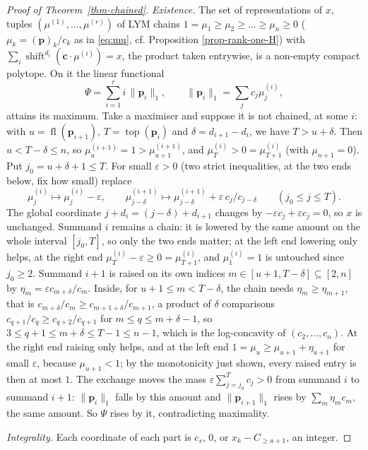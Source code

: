 \documentclass[11pt, a4paper, abstract=yes]{scrartcl}
\theoremstyle{definition}
\theoremstyle{remark}
\theoremstyle{plain}
\newcommand{\vek}[1]{\boldsymbol{#1}}
\theoremstyle{remark}
\theoremstyle{plain}
\newcommand{\shift}{\operatorname{shift}}
\newcommand{\tp}{\operatorname{top}}
\newcommand{\fl}{\operatorname{fl}}
\begin{document}
\begin{proof}[Proof of Theorem~\ref{thm-chained}]
\emph{Existence.} The set of representations of \(x\), tuples \((\mu^{(1)},\dots,\mu^{(r)})\) of LYM
chains \(1=\mu_1\ge\mu_2\ge\dots\ge\mu_n\ge0\) (\(\mu_k=(\vek p)_k/c_k\) as in \eqref{eq:mu}, cf. Proposition
\ref{prop-rank-one-H}) with \(\sum_i\shift^{d_i}(\vek c\cdot\mu^{(i)})=x\), the product taken
entrywise, is a non-empty compact polytope. On it the linear functional
\begin{equation}\label{eq:Psi}
  \Psi=\sum_{i=1}^r i\,\bigl\lVert\vek p_i\bigr\rVert_1,\qquad
  \bigl\lVert\vek p_i\bigr\rVert_1=\sum_{j}c_j\mu^{(i)}_j ,
\end{equation}
attains its maximum. Take a maximiser and suppose it is not chained, at some \(i\): with
\(u=\fl(\vek p_{i+1})\), \(T=\tp(\vek p_i)\) and \(\delta=d_{i+1}-d_i\), we have \(T>u+\delta\).
Then \(u<T-\delta\le n\), so \(\mu^{(i+1)}_u=1>\mu^{(i+1)}_{u+1}\), and \(\mu^{(i)}_T>0=\mu^{(i)}_{T+1}\)
(with \(\mu_{n+1}=0\)). Put \(j_0=u+\delta+1\le T\). For small \(\varepsilon>0\) (two strict
inequalities, at the two ends below, fix how small) replace
\begin{equation}\label{eq:exchange}
  \mu^{(i)}_j\mapsto\mu^{(i)}_j-\varepsilon,\qquad
  \mu^{(i+1)}_{j-\delta}\mapsto\mu^{(i+1)}_{j-\delta}+\varepsilon\,c_j/c_{j-\delta}\qquad(j_0\le j\le T).
\end{equation}
The global coordinate \(j+d_i=(j-\delta)+d_{i+1}\) changes by \(-\varepsilon c_j+\varepsilon c_j=0\),
so \(x\) is unchanged. Summand \(i\) remains a chain: it is lowered by the same amount on the whole
interval \([j_0,T]\), so only the two ends matter; at the left end lowering only helps, at the right
end \(\mu^{(i)}_T-\varepsilon\ge0=\mu^{(i)}_{T+1}\), and \(\mu^{(i)}_1=1\) is untouched since
\(j_0\ge2\). Summand \(i+1\) is raised on its own indices \(m\in[u+1,T-\delta]\subseteq[2,n]\) by
\(\eta_m=\varepsilon c_{m+\delta}/c_m\). Inside, for \(u+1\le m<T-\delta\), the chain needs
\(\eta_m\ge\eta_{m+1}\), that is \(c_{m+\delta}/c_m\ge c_{m+1+\delta}/c_{m+1}\), a product of
\(\delta\) comparisons \(c_{q+1}/c_q\ge c_{q+2}/c_{q+1}\) for \(m\le q\le m+\delta-1\), so
\(3\le q+1\le m+\delta\le T-1\le n-1\), which is the log-concavity of \((c_2,\dots,c_n)\). At the
right end raising only helps, and at the left end \(1=\mu_u\ge\mu_{u+1}+\eta_{u+1}\) for small
\(\varepsilon\), because \(\mu_{u+1}<1\); by the monotonicity just shown, every raised entry is
then at most \(1\). The exchange moves the mass
\(\varepsilon\sum_{j=j_0}^{T}c_j>0\) from summand \(i\) to summand \(i+1\):
\(\lVert\vek p_i\rVert_1\) falls by this amount and \(\lVert\vek p_{i+1}\rVert_1\) rises by
\(\sum_m\eta_mc_m\), the same amount. So \(\Psi\) rises by it, contradicting maximality.

\emph{Integrality.} Each coordinate of each part is \(c_s\), \(0\), or \(x_k-C_{\ge a+1}\), an integer.
\end{proof}
\end{document}
